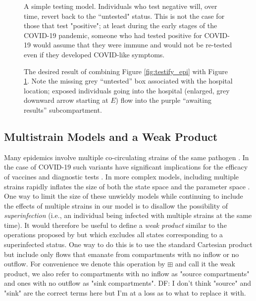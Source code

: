 \documentclass[pdflatex,sn-basic]{sn-jnl}%
\theoremstyle{definition}
\newcommand{\df}[1]{{\color{orange} DF: #1}}
\begin{document}
\begin{figure}
    \centering
    
    \caption{A simple testing model. Individuals who test negative will, over time, revert back to the “untested" status. This is not the case for those that test "positive"; at least during the early stages of the COVID-19 pandemic, someone who had tested positive for COVID-19 would assume that they were immune and would not be re-tested even if they developed COVID-like symptoms.}
    \label{fig:testify_states}
\end{figure}

\begin{figure}
    \centering
    
    \caption{The desired result of combining Figure \ref{fig:testify_epi} with Figure \ref{fig:testify_states}. Note the missing grey ``untested'' box associated with the hospital location; exposed individuals going into the hospital (enlarged, grey downward arrow starting at $E$) flow into the purple ``awaiting results'' subcompartment.}
    \label{fig:testify_desired}
\end{figure}

\FloatBarrier


\subsection{Multistrain Models and a Weak Product}\label{wp}
Many epidemics involve multiple co-circulating strains of the same pathogen \citep{gog2002dynamics, williams2021localization}. In the case of COVID-19 such variants have significant implications for the efficacy of vaccines \citep{abu2021effectiveness, koyama2020emergence} and diagnostic tests \citep{vasireddy2021review}. In more complex models, including multiple strains rapidly inflates the size of both the state space and the parameter space \citep{kryazhimskiy2007state}. One way to limit the size of these unwieldy models while continuing to include the effects of multiple strains in our model is to disallow the possibility of \emph{superinfection} (i.e., an individual being infected with multiple strains at the same time). It would therefore be useful to define a \emph{weak product} similar to the operations proposed by \cite{worden2017products} but which excludes all states corresponding to a superinfected status. One way to do this is to use the standard Cartesian product but include only flows that emanate from compartments with no inflow or no outflow. For convenience we denote this operation by $\boxplus$ and call it the weak product, we also refer to compartments with no inflow as "source compartments" and ones with no outflow as "sink compartments". \df{I don't think "source" and "sink" are the correct terms here but I'm at a loss as to what to replace it with.}
\end{document}
